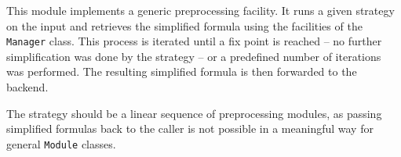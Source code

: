 This module implements a generic preprocessing facility.
It runs a given strategy on the input and retrieves the simplified formula using the facilities of the \texttt{Manager} class.
This process is iterated until a fix point is reached -- no further simplification was done by the strategy -- or a predefined number of iterations was performed.
The resulting simplified formula is then forwarded to the backend.

The strategy should be a linear sequence of preprocessing modules, as passing simplified formulas back to the caller is not possible in a meaningful way for general \texttt{Module} classes.
